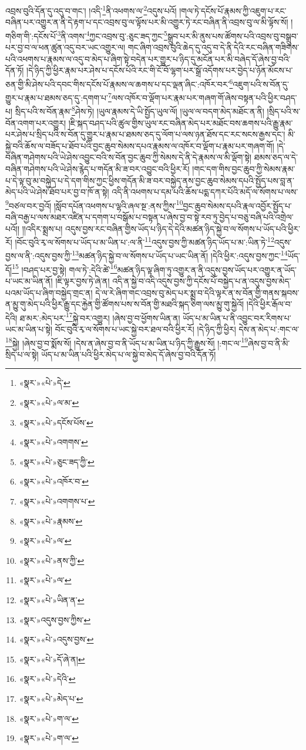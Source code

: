 འབྲས་བུའི་དོན་དུ་འདུ་བ་གང་། །འདི་\footnote{«སྣར་»«པེ་»དེ་}ནི་འཕགས་ལ་\footnote{«སྣར་»«པེ་»ལ་མ་}འདུས་པའོ། །གལ་ཏེ་དངོས་པོ་རྣམས་ཀྱི་འཇུག་པ་རང་བཞིན་པར་འགྱུར་ན་ནི་དེ་རྟག་པ་དང་འབྲས་བུ་ལ་ལྟོས་པར་མི་འགྱུར་ཏེ་རང་བཞིན་ནི་འབྲས་བུ་ལ་མི་ལྟོས་སོ། །གཅིག་གི་:དངོས་པོ་\footnote{«སྣར་»«པེ་»དངོས་པོས་}ནི་འགས་\footnote{«སྣར་»«པེ་»འགགས་}ཀྱང་འབྲས་བུ་:ཅུང་ཟད་ཀྱང་\footnote{«སྣར་»«པེ་»ཅུང་ཟད་ཀྱི་}སྒྲུབ་པར་མི་ནུས་པས་ཚོགས་པའི་འབྲས་བུ་བསྒྲུབ་པར་བྱ་བ་ལ་ཕན་ཚུན་འདུ་བར་ཡང་འགྱུར་ལ། གང་ཞིག་འབྲས་བུའི་ཆེད་དུ་འདུ་བ་དེ་ནི་དེའི་རང་བཞིན་གཟིགས་པའི་འཕགས་པ་རྣམས་ལ་འདུ་བ་མེད་པ་ཞིག་སྟེ་བདེན་པར་གྱུར་པ་ཉིད་དུ་མངོན་པར་མི་བཞེད་དོ་ཞེས་བྱ་བའི་དོན་ཏོ། །དེ་ཉིད་ཀྱི་ཕྱིར་རྣམ་པར་ཤེས་པ་དངོས་པོའི་རང་གི་ངོ་བོ་ལྷག་པར་སྒྲོ་འདོགས་པར་བྱེད་པ་ཉོན་མོངས་པ་ཅན་གྱི་མི་ཤེས་པའི་དབང་གིས་དངོས་པོ་རྣམས་ལ་ཆགས་པ་དང་ལྡན་ཞིང་:འཁོར་བར་\footnote{«སྣར་»«པེ་»འཁོར་བ་}འཇུག་པའི་ས་བོན་དུ་གྱུར་པ་རྣམ་པ་ཐམས་ཅད་དུ་:དགག་པ་\footnote{«སྣར་»«པེ་»འགགས་པ་}ལས་འཁོར་བ་ལྡོག་པར་རྣམ་པར་གཞག་གོ་ཞེས་བསྟན་པའི་ཕྱིར་བཤད་པ། སྲིད་པའི་ས་བོན་རྣམ་\footnote{«སྣར་»«པེ་»རྣམས་}ཤེས་ཏེ། །ཡུལ་རྣམས་དེ་ཡི་སྤྱོད་ཡུལ་ལོ། །ཡུལ་ལ་བདག་མེད་མཐོང་ན་ནི། །སྲིད་པའི་ས་བོན་འགག་པར་འགྱུར། །ཇི་སྐད་བཤད་པའི་ཚུལ་གྱིས་ཡུལ་རང་བཞིན་མེད་པར་མཐོང་བས་ཆགས་པའི་རྒྱུ་རྣམ་པར་ཤེས་པ་སྲིད་པའི་ས་བོན་དུ་གྱུར་པ་རྣམ་པ་ཐམས་ཅད་དུ་ལོག་པ་ལས་ཉན་ཐོས་དང་རང་སངས་རྒྱས་དང་། མི་སྐྱེ་བའི་ཆོས་ལ་བཟོད་པ་ཐོབ་པའི་བྱང་ཆུབ་སེམས་དཔའ་རྣམས་ལ་འཁོར་བ་ལྡོག་པ་རྣམ་པར་གཞག་གོ། །དེ་བཞིན་གཤེགས་པའི་ཡེ་ཤེས་འབྱུང་བའི་ས་བོན་བྱང་ཆུབ་ཀྱི་སེམས་དེ་ནི་དེ་རྣམས་ལ་མི་ལྡོག་སྟེ། ཐམས་ཅད་ལ་དེ་བཞིན་གཤེགས་པའི་ཡེ་ཤེས་རྙེད་པ་གདོན་མི་ཟ་བར་འབྱུང་བའི་ཕྱིར་རོ། །གང་དག་གིས་བྱང་ཆུབ་ཀྱི་སེམས་རྣམ་པ་དེ་ལྟ་བུ་མ་བསྐྱེད་པ་དེ་དག་གིས་ཀྱང་ཕྱིས་གདོན་མི་ཟ་བར་བསྐྱེད་ནས་བྱང་ཆུབ་སེམས་དཔའི་སྤྱོད་པས་བླ་ན་མེད་པའི་ཡེ་ཤེས་ཐོབ་པར་བྱ་བ་ཁོ་ན་སྟེ། འདི་ནི་འཕགས་པ་དམ་པའི་ཆོས་པདྨ་དཀར་པོའི་མདོ་ལ་སོགས་པ་ལས་\footnote{«སྣར་»«པེ་»ལ་}བཙལ་བར་བྱའོ། །སློབ་དཔོན་འཕགས་པ་ལྷའི་ཞལ་སྔ་:ནས་ཀྱིས་\footnote{«སྣར་»«པེ་»ནས་ཀྱི་}བྱང་ཆུབ་སེམས་དཔའི་རྣལ་འབྱོར་སྤྱོད་པ་བཞི་བརྒྱ་པ་ལས་མཐར་འཛིན་པ་དགག་པ་བསྒོམ་པ་བསྟན་པ་ཞེས་བྱ་བ་སྟེ་རབ་ཏུ་བྱེད་པ་བཅུ་བཞི་པའི་འགྲེལ་པའོ།། །།འདིར་སྨྲས་པ། འདུས་བྱས་རང་བཞིན་གྱིས་ཡོད་པ་ཉིད་དེ་དེའི་མཚན་ཉིད་སྐྱེ་བ་ལ་སོགས་པ་ཡོད་པའི་ཕྱིར་རོ། །བོང་བུའི་རྭ་ལ་སོགས་པ་ཡོད་པ་མ་ཡིན་པ་:ལ་ནི་\footnote{«སྣར་»«པེ་»ལ་}འདུས་བྱས་ཀྱི་མཚན་ཉིད་ཡོད་པ་མ་:ཡིན་ཏེ་\footnote{«སྣར་»«པེ་»ཡིན་ན་}འདུས་བྱས་ལ་ནི་:འདུས་བྱས་ཀྱི་\footnote{«སྣར་»འདུས་བྱས་ཀྱིས་}མཚན་ཉིད་སྐྱེ་བ་ལ་སོགས་པ་ཡོད་པ་ཡང་ཡིན་ནོ། །དེའི་ཕྱིར་:འདུས་བྱས་ཀྱང་\footnote{«སྣར་»«པེ་»འདུས་བྱས་}ཡོད་དོ།\footnote{«སྣར་»«པེ་»དོ་ཞེ་ན།} །བཤད་པར་བྱ་སྟེ། གལ་ཏེ་:དེའི་ཚེ་\footnote{«སྣར་»«པེ་»དེའི་}མཚན་ཉིད་ལྟ་ཞིག་ཏུ་འགྱུར་ན་ནི་འདུས་བྱས་ཡོད་པར་འགྱུར་ན་ཡོད་པ་ཡང་མ་ཡིན་ནོ། །ཇི་ལྟར་བྱས་ཏེ་ཞེ་ན། འདི་ན་སྐྱེ་བ་འདི་འདུས་བྱས་ཀྱི་དངོས་པོ་བསྐྱེད་པ་ན་འདུས་བྱས་མེད་པའམ་ཡོད་པ་ཞིག་བསྐྱེད་གྲང་ན། དེ་ལ་རེ་ཞིག་གང་འབྲས་བུ་མེད་པར་སྨྲ་བ་དེའི་ལྟར་ན་ས་བོན་གྱི་གནས་སྐབས་ན་མྱུ་གུ་མེད་པའི་ཕྱིར་རྒྱུ་དང་རྐྱེན་གྱི་ཚོགས་པས་ས་བོན་གྱི་མཐའི་སྐད་ཅིག་ལས་མྱུ་གུ་སྐྱེའོ། །དེའི་ཕྱིར་རྒོལ་བ་དེའི། ཐ་མར་:མེད་པར་\footnote{«སྣར་»«པེ་»མེད་པ་}སྐྱེ་བར་འགྱུར། །ཞེས་བྱ་བ་ཕྱོགས་ཡིན་ན། ཡོད་པ་མ་ཡིན་པ་ནི་འབྱུང་བར་རིགས་པ་ཡང་མ་ཡིན་པ་སྟེ། བོང་བུའི་རྭ་ལ་སོགས་པ་ཡང་སྐྱེ་བར་ཐལ་བའི་ཕྱིར་རོ། །དེ་ཉིད་ཀྱི་ཕྱིར། དེས་ན་མེད་པ་:གང་ལ་\footnote{«སྣར་»«པེ་»ག་ལ་}སྐྱེ། །ཞེས་བྱ་བ་སྨོས་སོ། །དེས་ན་ཞེས་བྱ་བ་ནི་ཡོད་པ་མ་ཡིན་པ་ཉིད་ཀྱི་རྒྱུས་སོ། །:གང་ལ་\footnote{«སྣར་»«པེ་»ག་ལ་}ཞེས་བྱ་བ་ནི་མི་སྲིད་པ་ལ་སྟེ། ཡོད་པ་མ་ཡིན་པའི་ཕྱིར་མེད་པ་ལ་སྐྱེ་བ་མེད་དོ་ཞེས་བྱ་བའི་དོན་ཏོ། 